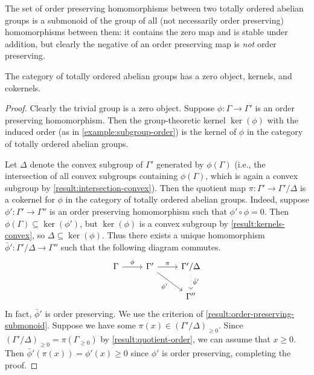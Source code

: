 \begin{remark}
The set of order preserving homomorphisms between two totally ordered abelian groups is a submonoid of the group of all (not necessarily order preserving) homomorphisms between them: it contains the zero map and is stable under addition, but clearly the negative of an order preserving map is \emph{not} order preserving. 
\end{remark}

\begin{lemma}
\label{result:categorical-zero-kernels-cokernels}
The category of totally ordered abelian groups has a zero object, kernels, and cokernels. 
\end{lemma}

\begin{proof}
Clearly the trivial group is a zero object. Suppose $\phi : \Gamma \to \Gamma'$ is an order preserving homomorphism. Then the group-theoretic kernel $\ker(\phi)$ with the induced order (as in \cref{example:subgroup-order}) is the kernel of $\phi$ in the category of totally ordered abelian groups. 

Let $\Delta$ denote the convex subgroup of $\Gamma'$ generated by $\phi(\Gamma)$ (i.e., the intersection of all convex subgroups containing $\phi(\Gamma)$, which is again a convex subgroup by \cref{result:intersection-convex}). Then the quotient map $\pi : \Gamma' \to \Gamma'/\Delta$ is a cokernel for $\phi$ in the category of totally ordered abelian groups. Indeed, suppose $\phi' : \Gamma' \to \Gamma''$ is an order preserving homomorphism such that $\phi' \circ \phi = 0$. Then $\phi(\Gamma) \subseteq \ker(\phi')$, but $\ker(\phi)$ is a convex subgroup by \cref{result:kernels-convex}, so $\Delta \subseteq \ker(\phi)$. Thus there exists a unique homomorphism $\bar{\phi}' : \Gamma'/\Delta \to \Gamma''$ such that the following diagram commutes.
\[ \begin{tikzcd} \Gamma \ar{r}{\phi} & \Gamma' \ar{r}{\pi} \ar{dr}[swap]{\phi'} & \Gamma'/\Delta \ar[dotted]{d}{\bar{\phi}'} \\ & & \Gamma'' \end{tikzcd} \]
In fact, $\bar{\phi}'$ is order preserving. We use the criterion of \cref{result:order-preserving-submonoid}. Suppose we have some $\pi(x) \in (\Gamma'/\Delta)_{\geq 0}$. Since $(\Gamma'/\Delta)_{\geq 0} = \pi(\Gamma_{\geq 0})$ by \cref{result:quotient-order}, we can assume that $x \geq 0$. Then $\bar{\phi}'(\pi(x)) = \phi'(x) \geq 0$ since $\phi'$ is order preserving, completing the proof. 
\end{proof}

